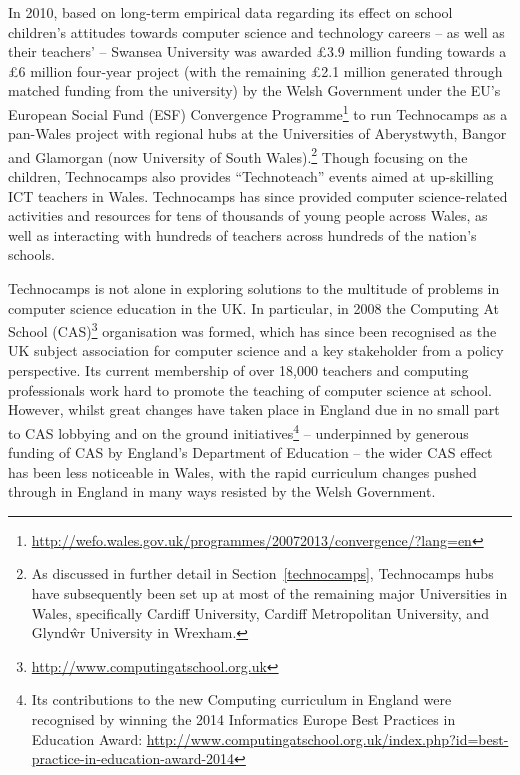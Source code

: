 \documentclass{sig-alternate}
\begin{document}
In 2010, based on long-term empirical data regarding its effect on
school children's attitudes towards computer science and technology
careers -- as well as their teachers' -- Swansea University was
awarded \pounds 3.9 million funding towards a \pounds 6 million
four-year project (with the remaining \pounds 2.1 million generated
through matched funding from the university) by the Welsh Government
under the EU's European Social Fund (ESF) Convergence
Programme\footnote{\url{http://wefo.wales.gov.uk/programmes/20072013/convergence/?lang=en}}
to run Technocamps as a pan-Wales project with regional hubs at the
Universities of Aberystwyth, Bangor and Glamorgan (now University of
South Wales).\footnote{As discussed in further detail in
Section~\ref{technocamps}, Technocamps hubs have subsequently been set
up at most of the remaining major Universities in Wales, specifically
Cardiff University, Cardiff Metropolitan University, and Glynd\^wr
University in Wrexham.}  Though focusing on the children, Technocamps
also provides ``Technoteach'' events aimed at up-skilling ICT teachers
in Wales.  Technocamps has since provided computer science-related
activities and resources for tens of thousands of young people across
Wales, as well as interacting with hundreds of teachers across
hundreds of the nation's schools.

Technocamps is not alone in exploring solutions to the multitude of
problems in computer science education in the UK.  In particular, in
2008 the Computing At School
(CAS)\footnote{\url{http://www.computingatschool.org.uk}} organisation
was formed, which has since been recognised as the UK subject
association for computer science and a key stakeholder from a policy
perspective. Its current membership of over 18,000 teachers and
computing professionals work hard to promote the teaching of computer
science at school. However, whilst great changes have taken place in
England due in no small part to CAS lobbying and on the ground
initiatives\footnote{Its contributions to the new Computing curriculum
in England were recognised by winning the 2014 Informatics Europe Best
Practices in Education Award:
\url{http://www.computingatschool.org.uk/index.php?id=best-practice-in-education-award-2014}}
-- underpinned by generous funding of CAS by England's Department of
Education -- the wider CAS effect has been less noticeable in Wales,
with the rapid curriculum changes pushed through in England in many
ways resisted by the Welsh Government.
\end{document}
